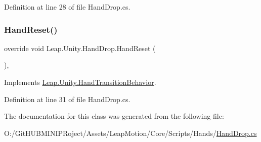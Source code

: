 Definition at line 28 of file Hand\+Drop.\+cs.

\mbox{\label{class_leap_1_1_unity_1_1_hand_drop_aa553110438e7eaee2617cc3f9e19a7a2}} 
\subsubsection{\texorpdfstring{HandReset()}{HandReset()}}
{\footnotesize\ttfamily override void Leap.\+Unity.\+Hand\+Drop.\+Hand\+Reset (\begin{DoxyParamCaption}{ }\end{DoxyParamCaption})\hspace{0.3cm}{\ttfamily [protected]}, {\ttfamily [virtual]}}



Implements \mbox{\hyperlink{class_leap_1_1_unity_1_1_hand_transition_behavior_ae0a27730cfec3d323289ef7d4ef950d7}{Leap.\+Unity.\+Hand\+Transition\+Behavior}}.



Definition at line 31 of file Hand\+Drop.\+cs.



The documentation for this class was generated from the following file\+:\begin{DoxyCompactItemize}
\item 
O\+:/\+Git\+H\+U\+B\+M\+I\+N\+I\+P\+Roject/\+Assets/\+Leap\+Motion/\+Core/\+Scripts/\+Hands/\mbox{\hyperlink{_hand_drop_8cs}{Hand\+Drop.\+cs}}\end{DoxyCompactItemize}
